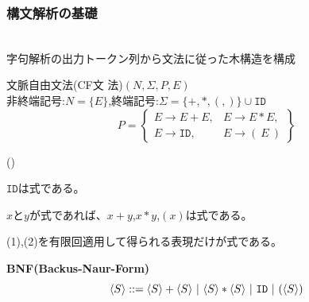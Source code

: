 \documentclass[dvipdfmx]{beamer}
\newcounter{coffee}
\begin{document}
\begin{frame}
  \frametitle{構文解析の基礎}
  \begin{list}{}{}
    \item [\bluetext{{\bf 構文解析}}]\ \\
          字句解析の出力トークン列から文法に従った木構造を構成\\[5pt]
    \item [\bluetext{{\bf 文法}}] 文脈自由文法(CF文
          法)\quad$(N,\Sigma,P,E)$\\
          非終端記号:$N=\{E\}$,終端記号:$\Sigma=\{+,*,(,)\}\cup\mathtt{ID}$
          \[
            P=
            \left\{
            \begin{array}{ll}
              E\rightarrow E+E,        &
              E\rightarrow E*E,                              \\
              E\rightarrow\mathtt{ID}, & E\rightarrow(\ E\ )
            \end{array}
            \right\}
          \]
          \begin{list}{()}{\setlength{\itemsep}{5pt}}
            \item ${\mathtt{ID}}$は式である。
            \item $x$と$y$が式であれば、$x+y$,$x*y$,$(x)$は式である。
            \item (1),(2)を有限回適用して得られる表現だけが式である。
          \end{list}
    \item {\bf BNF(Backus-Naur-Form)}
          \[
            \tuple{S}::=\tuple{S}+\tuple{S}\ |\ \tuple{S}*\tuple{S}\ |
            \ {\mathtt{ID}}\ |\ (\tuple{S})
          \]
  \end{list}
\end{frame}
\end{document}
